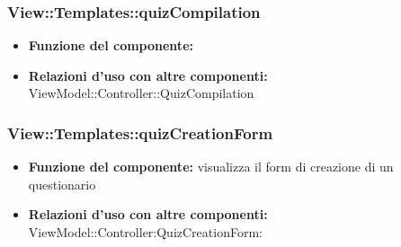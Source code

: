 \subsubsection{View::Templates::quizCompilation}
\begin{itemize}
\item\textbf{Funzione del componente:} \\
\item\textbf{Relazioni d'uso con altre componenti:} ViewModel::Controller::QuizCompilation\\
\end{itemize}
\subsubsection{View::Templates::quizCreationForm}
\begin{itemize}
\item\textbf{Funzione del componente:} visualizza il form di creazione di un questionario\\
\item\textbf{Relazioni d'uso con altre componenti:} ViewModel::Controller:QuizCreationForm:\\
\end{itemize}





